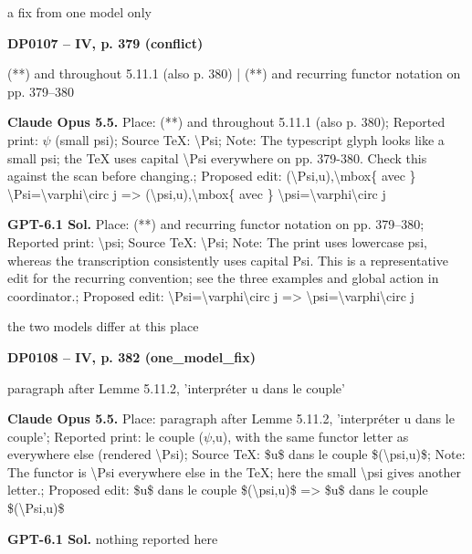 a fix from one model only\par
\par\noindent\hypertarget{DP0107}{}\textbf{DP0107 -- IV, p. 379 (conflict)}\par
(**) and throughout 5.11.1 (also p. 380) | (**) and recurring functor notation on pp. 379–380\par
\textbf{Claude Opus 5.5.} Place: (**) and throughout 5.11.1 (also p. 380); Reported print: \ensuremath{\psi} (small psi); Source TeX: \textbackslash{}Psi; Note: The typescript glyph looks like a small psi; the TeX uses capital \textbackslash{}Psi everywhere on pp. 379-380. Check this against the scan before changing.; Proposed edit: (\textbackslash{}Psi,u),\textbackslash{}mbox\{ avec \} \textbackslash{}Psi=\allowbreak \textbackslash{}varphi\textbackslash{}circ j =\allowbreak > (\textbackslash{}psi,u),\textbackslash{}mbox\{ avec \} \textbackslash{}psi=\allowbreak \textbackslash{}varphi\textbackslash{}circ j\par
\textbf{GPT-6.1 Sol.} Place: (**) and recurring functor notation on pp. 379–380; Reported print: \textbackslash{}psi; Source TeX: \textbackslash{}Psi; Note: The print uses lowercase psi, whereas the transcription consistently uses capital Psi. This is a representative edit for the recurring convention; see the three examples and global action in coordinator.; Proposed edit: \textbackslash{}Psi=\allowbreak \textbackslash{}varphi\textbackslash{}circ j =\allowbreak > \textbackslash{}psi=\allowbreak \textbackslash{}varphi\textbackslash{}circ j\par
the two models differ at this place\par
\par\noindent\hypertarget{DP0108}{}\textbf{DP0108 -- IV, p. 382 (one\_model\_fix)}\par
paragraph after Lemme 5.11.2, 'interpréter u dans le couple'\par
\textbf{Claude Opus 5.5.} Place: paragraph after Lemme 5.11.2, 'interpréter u dans le couple'; Reported print: le couple (\ensuremath{\psi},u), with the same functor letter as everywhere else (rendered \textbackslash{}Psi); Source TeX: \$u\$ dans le couple \$(\textbackslash{}psi,u)\$; Note: The functor is \textbackslash{}Psi everywhere else in the TeX; here the small \textbackslash{}psi gives another letter.; Proposed edit: \$u\$ dans le couple \$(\textbackslash{}psi,u)\$ =\allowbreak > \$u\$ dans le couple \$(\textbackslash{}Psi,u)\$\par
\textbf{GPT-6.1 Sol.} nothing reported here\par
